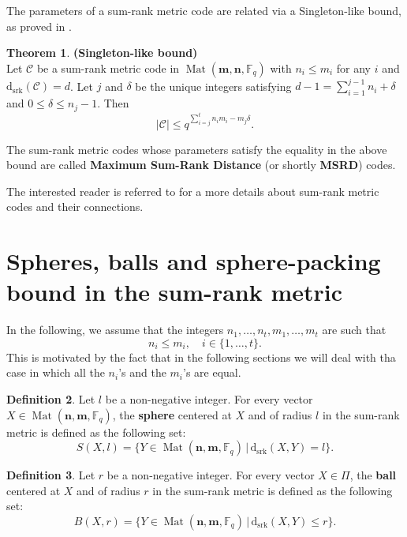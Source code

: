 \documentclass[11pt]{amsart}
\newcommand{\dsrk}{\mathrm{d}_{\mathrm{srk}}}
\DeclareMathOperator{\Mat}{Mat}
\theoremstyle{definition}
\newtheorem{theorem}{Theorem}[section]
\newtheorem{definition}[theorem]{Definition}
\newcommand{\F}{{\mathbb F}}
\newcommand{\bfn}{\mathbf {n}}
\newcommand{\bfm}{\mathbf {m}}
\newcommand{\spacmn}{\Mat(\bfn,\bfm,\F_q)}
\begin{document}

The parameters of a sum-rank metric code are related via a Singleton-like bound, as proved in \cite[Theorem 3.2]{byrne2021fundamental}.

\begin{theorem}  \label{th:SingletonboundmatrixRav} \textbf{(Singleton-like bound)} \\
    Let $\mathcal{C}$ be a sum-rank metric code in $\Mat(\textbf{m},\bfn,\F_q)$ with $n_i \leq m_i$ for any $i$ and $\dsrk(\mathcal{C})=d$.
    Let $j$ and $\delta$ be the unique integers satisfying $d-1=\sum_{i=1}^{j-1}n_i+\delta$ and $0 \leq \delta \leq n_j-1$. Then \[\lvert \mathcal{C} \rvert \leq q^{\sum_{i=j}^tn_im_i-m_j \delta}.\]
\end{theorem}

The sum-rank metric codes whose parameters satisfy the equality in the above bound are called \textbf{Maximum Sum-Rank Distance} (or shortly \textbf{MSRD}) codes.

The interested reader is referred to \cite{byrne2021fundamental,byrne2020anticodes,gorla2023sum,moreno2021optimal} for a more details about sum-rank metric codes and their connections.

\section{Spheres, balls and sphere-packing bound in the sum-rank metric}\label{sec:balls}

In the following, we assume that the integers $n_1,\ldots,n_t,m_1,\ldots,m_t$ are such that 
\[ n_i \leq m_i, \quad i \in \{1,\ldots,t\}.\]
This is motivated by the fact that in the following sections we will deal with tha case in which all the $n_i$'s and the $m_i$'s are equal.

\begin{definition}
Let $l$ be a non-negative integer. For every vector $X \in \spacmn$, the \textbf{sphere} centered at $X$ and of radius $l$ in the sum-rank metric is defined as the following set:
$$S(X,l)=\{Y \in \spacmn \, | \, \dsrk(X,Y) = l\}.$$
\end{definition}

\begin{definition}
Let $r$ be a non-negative integer. For every vector $X \in \Pi$, the \textbf{ball} centered at $X$ and of radius $r$ in the sum-rank metric is defined as the following set:
$$B(X,r)=\{Y \in \spacmn \, | \, \dsrk(X,Y) \leq r\}.$$
\end{definition}
\end{document}
